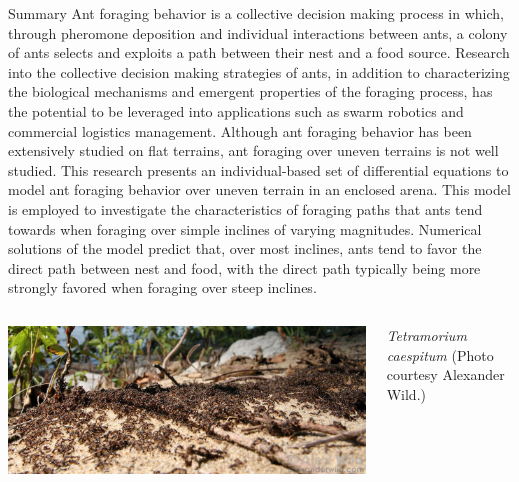 \documentclass[final,table]{beamer}
\newlength{\onecolwid}
\begin{document}
\begin{frame}[t]
\begin{columns}[t]
\begin{column}{\onecolwid}
\vspace{-3.5ex}
\begin{block}{Summary}
\vspace{-2.5ex}
{\small
Ant foraging behavior is a collective decision making process in which, through  pheromone deposition and individual interactions between ants, a colony of ants selects and exploits a path between their nest and a food source. Research into the collective decision making strategies of ants, in addition to characterizing the biological mechanisms and emergent properties of the foraging process, has the potential to be leveraged into applications such as swarm robotics and commercial logistics management. Although ant foraging behavior has been extensively studied on flat terrains, ant foraging over uneven terrains is not well studied. This research presents an individual-based set of differential equations to model ant foraging behavior over uneven terrain in an enclosed arena. This model is employed to investigate the characteristics of foraging paths that ants tend towards when foraging over simple inclines of varying magnitudes. Numerical solutions of the model predict that, over most inclines, ants tend to favor the direct path between nest and food, with the direct path typically being more strongly favored when foraging over steep inclines.
}
\vspace{-0.5ex}
\begin{columns}[T, onlytextwidth]
\includegraphics[width=\textwidth]{images/ant_battle1-XL_reduced}
\begin{spacing}{1.0}
{\small
\textit{Tetramorium caespitum} (Photo courtesy Alexander Wild.)}
\end{spacing}
\end{columns}


\end{block}
\end{column}
\end{columns}
\end{frame}
\end{document}
